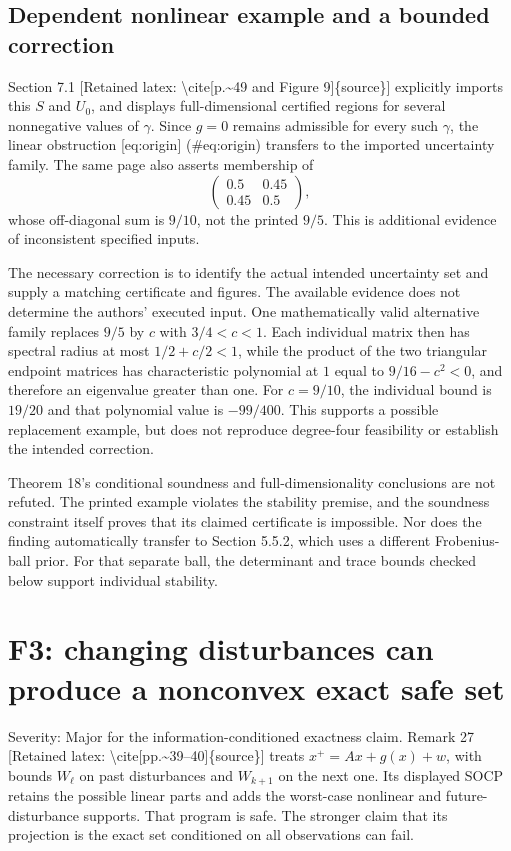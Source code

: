 \documentclass[10pt]{article}
\begin{document}
\subsection*{Dependent nonlinear example and a bounded correction}
Section 7.1 [Retained latex: \textbackslash{}cite[p.\textasciitilde{}49 and Figure 9]\{source\}] explicitly imports this \(S\) and \(U_0\), and displays full-dimensional certified regions for several nonnegative values of \(\gamma\). Since \(g=0\) remains admissible for every such \(\gamma\), the linear obstruction [eq:origin] (\#eq:origin) transfers to the imported uncertainty family. The same page also asserts membership of \[\begin{pmatrix}0.5&0.45\\0.45&0.5\end{pmatrix},\] whose off-diagonal sum is \(9/10\), not the printed \(9/5\). This is additional evidence of inconsistent specified inputs.\par
The necessary correction is to identify the actual intended uncertainty set and supply a matching certificate and figures. The available evidence does not determine the authors’ executed input. One mathematically valid alternative family replaces \(9/5\) by \(c\) with \(3/4<c<1\). Each individual matrix then has spectral radius at most \(1/2+c/2<1\), while the product of the two triangular endpoint matrices has characteristic polynomial at \(1\) equal to \(9/16-c^2<0\), and therefore an eigenvalue greater than one. For \(c=9/10\), the individual bound is \(19/20\) and that polynomial value is \(-99/400\). This supports a possible replacement example, but does not reproduce degree-four feasibility or establish the intended correction.\par
Theorem 18’s conditional soundness and full-dimensionality conclusions are not refuted. The printed example violates the stability premise, and the soundness constraint itself proves that its claimed certificate is impossible. Nor does the finding automatically transfer to Section 5.5.2, which uses a different Frobenius-ball prior. For that separate ball, the determinant and trace bounds checked below support individual stability.\par
\section*{F3: changing disturbances can produce a nonconvex exact safe set}
Severity: Major for the information-conditioned exactness claim. Remark 27 [Retained latex: \textbackslash{}cite[pp.\textasciitilde{}39--40]\{source\}] treats \(x^+=Ax+g(x)+w\), with bounds \(W_\ell\) on past disturbances and \(W_{k+1}\) on the next one. Its displayed SOCP retains the possible linear parts and adds the worst-case nonlinear and future-disturbance supports. That program is safe. The stronger claim that its projection is the exact set conditioned on all observations can fail.\par
\end{document}
